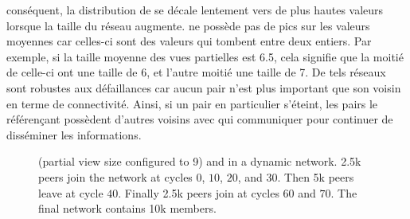 \begin{asparadesc}
  conséquent, la distribution de \SPRAY se décale lentement vers de plus hautes
  valeurs lorsque la taille du réseau augmente. \SPRAY ne possède pas de pics
  sur les valeurs moyennes car celles-ci sont des valeurs qui tombent entre deux
  entiers. Par exemple, si la taille moyenne des vues partielles est 6.5, cela
  signifie que la moitié de celle-ci ont une taille de 6, et l'autre moitié une
  taille de 7. De tels réseaux sont robustes aux défaillances car aucun pair
  n'est plus important que son voisin en terme de connectivité. Ainsi, si un
  pair en particulier s'éteint, les pairs le référençant possèdent d'autres
  voisins avec qui communiquer pour continuer de disséminer les informations.
\end{asparadesc}

\begin{figure}
  \centering
  \hspace{10pt}
  \caption{\label{fig:spray:churn}\CYCLON (partial view size configured to 9)
    and \SPRAY in a dynamic network. 2.5k peers join the network at cycles $0$,
    $10$, $20$, and $30$. Then 5k peers leave at cycle $40$. Finally 2.5k peers
    join at cycles $60$ and $70$. The final network contains 10k members.}
\end{figure}

